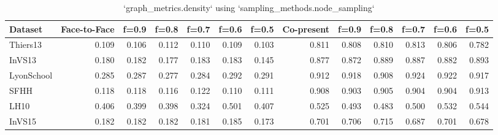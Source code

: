 \begin{table}[ht]
\begin{tabular}{lrrrrrrrrrrrr}
\hline
 Dataset    &   Face-to-Face &   f=0.9 &   f=0.8 &   f=0.7 &   f=0.6 &   f=0.5 &   Co-present &   f=0.9 &   f=0.8 &   f=0.7 &   f=0.6 &   f=0.5 \\
\hline
 Thiers13   &          0.109 &   0.106 &   0.112 &   0.110 &   0.109 &   0.103 &        0.811 &   0.808 &   0.810 &   0.813 &   0.806 &   0.782 \\
 InVS13     &          0.180 &   0.182 &   0.177 &   0.183 &   0.183 &   0.145 &        0.877 &   0.872 &   0.889 &   0.887 &   0.882 &   0.893 \\
 LyonSchool &          0.285 &   0.287 &   0.277 &   0.284 &   0.292 &   0.291 &        0.912 &   0.918 &   0.908 &   0.924 &   0.922 &   0.917 \\
 SFHH       &          0.118 &   0.118 &   0.116 &   0.122 &   0.110 &   0.111 &        0.908 &   0.903 &   0.905 &   0.904 &   0.904 &   0.913 \\
 LH10       &          0.406 &   0.399 &   0.398 &   0.324 &   0.501 &   0.407 &        0.525 &   0.493 &   0.483 &   0.500 &   0.532 &   0.544 \\
 InVS15     &          0.182 &   0.182 &   0.182 &   0.181 &   0.185 &   0.173 &        0.701 &   0.706 &   0.715 &   0.687 &   0.701 &   0.678 \\
\hline
\end{tabular}
\caption{`graph_metrics.density` using `sampling_methods.node_sampling`}
\end{table}
